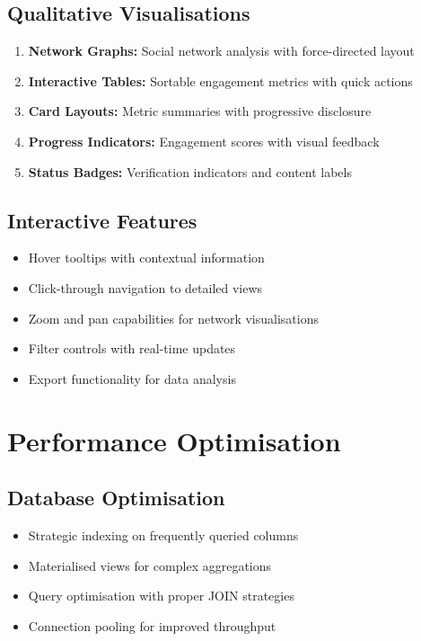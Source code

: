 \documentclass[12pt,a4paper]{article}
\begin{document}
\subsection{Qualitative Visualisations}
\begin{enumerate}
    \item \textbf{Network Graphs:} Social network analysis with force-directed layout
    \item \textbf{Interactive Tables:} Sortable engagement metrics with quick actions
    \item \textbf{Card Layouts:} Metric summaries with progressive disclosure
    \item \textbf{Progress Indicators:} Engagement scores with visual feedback
    \item \textbf{Status Badges:} Verification indicators and content labels
\end{enumerate}

\subsection{Interactive Features}
\begin{itemize}
    \item Hover tooltips with contextual information
    \item Click-through navigation to detailed views
    \item Zoom and pan capabilities for network visualisations
    \item Filter controls with real-time updates
    \item Export functionality for data analysis
\end{itemize}

\section{Performance Optimisation}

\subsection{Database Optimisation}
\begin{itemize}
    \item Strategic indexing on frequently queried columns
    \item Materialised views for complex aggregations
    \item Query optimisation with proper JOIN strategies
    \item Connection pooling for improved throughput
\end{itemize}
\end{document}

